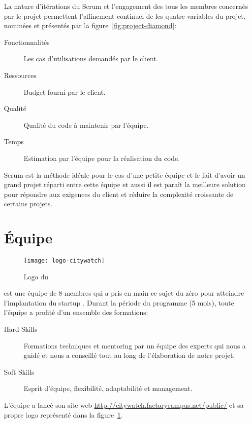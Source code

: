 La nature d'itérations du Scrum et l'engagement des tous les membres concernés
par le projet permettent l'affinement continuel de les quatre variables du
projet, nommées  et présentés par la
figure~\ref{fig:project-diamond}:

\begin{description}
    \item [Fonctionnalités] Les cas d'utilisations demandés par le client.
    \item [Ressources] Budget fourni par le client.
    \item [Qualité] Qualité du code à maintenir par l'équipe.
    \item [Temps] Estimation par l'équipe pour la réalisation du code.
\end{description}



Scrum est la méthode idéale pour le cas d'une petite équipe et le fait d'avoir
un grand projet réparti entre cette équipe et aussi il est paraît la meilleure
solution pour répondre aux exigences du client et réduire la complexité
croissante de certains projets.

\section{Équipe }

\begin{figure}[!h]
    \centering
    \texttt{[image: logo-citywatch]}
    \caption{Logo du }
\label{fig:logo-citywatch}
\end{figure}

 est une équipe de 8 membres qui a pris en main ce sujet
du zéro pour atteindre l'implantation du startup .
Durant la période du programme (5 mois), toute l'équipe a profité d'un ensemble
des formations:

\begin{description}
 \item [Hard Skills] Formations techniques et mentoring par un équipe des
     experts qui nous a guidé et nous a conseillé tout au long de l'élaboration
     de notre projet.
 \item [Soft Skills] Esprit d'équipe, flexibilité, adaptabilité et management.
\end{description}

L'équipe a lancé son site web \url{http://citywatch.factorycampus.net/public/}
et sa propre logo représenté dans la figure~\ref{fig:logo-citywatch}.

